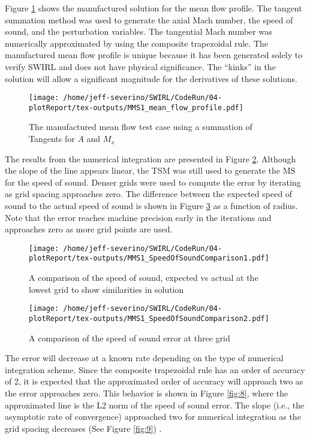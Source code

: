 Figure \ref{fig:1} shows the manufactured solution for the mean flow profile. The tangent
summation method was used to generate the axial Mach number, the speed of sound, and the perturbation variables. The tangential Mach number was numerically
approximated by using the composite trapezoidal rule. The manufactured mean flow
profile is unique because it has been generated solely to verify SWIRL
and does not have physical significance. The “kinks” in the solution will allow a significant magnitude for the derivatives of these solutions.
\begin{figure}[h!]
    \centering
    \texttt{[image: /home/jeff-severino/SWIRL/CodeRun/04-plotReport/tex-outputs/MMS1\_mean\_flow\_profile.pdf]}
    \caption{The manufactured mean flow test case using a summation of Tangents for $A$ and $M_x$}
    \label{fig:1}
\end{figure}
The results from the numerical integration are presented in Figure \ref{fig:5}. Although
the slope of the line appears linear, the TSM was still used to generate the MS for
the speed of sound. Denser grids were used to compute the error by iterating as grid spacing approaches zero. The difference
between the expected speed of sound to the actual speed of sound is shown in Figure
\ref{fig:5a} as a function of radius. Note that the error reaches machine precision early in the iterations and approaches zero as more grid points are used.
\begin{figure}[h!]
    \centering
    \texttt{[image: /home/jeff-severino/SWIRL/CodeRun/04-plotReport/tex-outputs/MMS1\_SpeedOfSoundComparison1.pdf]}
    \caption{ A comparison of the speed of sound, expected vs actual at the lowest grid to show similarities in solution}
    \label{fig:5}
\end{figure}


\begin{figure}[h!]
    \centering
    \texttt{[image: /home/jeff-severino/SWIRL/CodeRun/04-plotReport/tex-outputs/MMS1\_SpeedOfSoundComparison2.pdf]}
    \caption{ A comparison of the speed of sound error at three grid}
    \label{fig:5a}
\end{figure}
The error will decrease at a known rate depending on the type of numerical integration scheme. Since the composite trapezoidal rule has an order of accuracy
of 2, it is expected that the approximated order of accuracy will approach two as the
error approaches zero. This behavior is shown in Figure \ref{fig:8}, where the approximated
line is the L2 norm of the speed of sound error. The slope (i.e., the asymptotic rate of
convergence) approached two for numerical integration as the grid spacing decreases
(See Figure \ref{fig:9}) .


